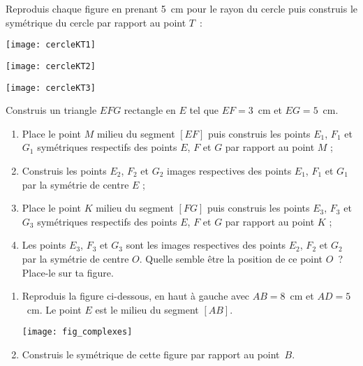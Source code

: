 \begin{exercice}
Reproduis chaque figure en prenant 5 cm pour le rayon du cercle puis construis le symétrique du cercle par rapport au point $T$ :
\begin{colenumerate}{3}
 \item \texttt{[image: cercleKT1]}
 \item \texttt{[image: cercleKT2]}
 \item \texttt{[image: cercleKT3]}
 \end{colenumerate}
\end{exercice}


\begin{exercice}
Construis un triangle $EFG$ rectangle en $E$ tel que $EF = 3$ cm et $EG = 5$ cm.
\begin{enumerate}
 \item Place le point $M$ milieu du segment $[EF]$ puis construis les points $E_1$, $F_1$ et $G_1$ symétriques respectifs des points $E$, $F$ et $G$ par rapport au point $M$ ;
 \item Construis les points $E_2$, $F_2$ et $G_2$ images respectives des points $E_1$, $F_1$ et $G_1$  par la symétrie de centre $E$ ;
 \item Place le point $K$ milieu du segment $[FG]$ puis construis les points $E_3$, $F_3$ et $G_3$ symétriques respectifs des points $E$, $F$ et $G$ par rapport au point $K$ ;
 \item Les points $E_3$, $F_3$ et $G_3$ sont les images respectives des points $E_2$, $F_2$ et $G_2$ par la symétrie de centre $O$. Quelle semble être la position de ce point $O$ ? Place-le sur ta figure.
 \end{enumerate}
\end{exercice}


\begin{exercice}
\begin{enumerate}
 \item Reproduis la figure ci-dessous, en haut à gauche avec $AB = 8$ cm et $AD = 5$ cm. Le point $E$ est le milieu du segment $[AB]$. 
 \begin{center} \texttt{[image: fig\_complexes]} \end{center}
 \item Construis le symétrique de cette figure par rapport au point $B$.
 \end{enumerate}
\end{exercice}


